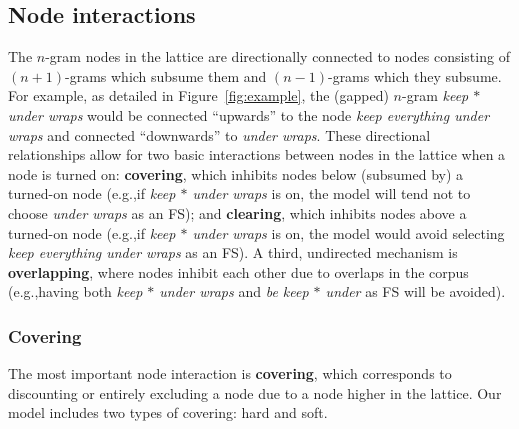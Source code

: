\documentclass[11pt,letterpaper]{article}
\makeatletter
\def \eg {e.g.,\@ }
\newcommand{\gap}{$*$\xspace}
\newcommand{\ex}[1]{\textit{#1}\xspace}
\newcommand{\termdef}[1]{\textbf{#1}\xspace}
\newcommand{\figref}[2][]{Figure#1~\ref{#2}\xspace}
\makeatother
\begin{document}
\subsection{Node interactions}

The $n$-gram nodes in the lattice are directionally connected to nodes consisting of $(n+1)$-grams which subsume them and $(n-1)$-grams which they subsume. For example, as detailed in \figref{fig:example}, the (gapped) $n$-gram \ex{keep \gap under wraps} would be connected ``upwards'' to the node \ex{keep everything under wraps} and connected ``downwards'' to \ex{under wraps}. These directional relationships allow for two basic interactions between nodes in the lattice when a node is turned on: \termdef{covering}, which inhibits nodes below (subsumed by) a turned-on node (\eg if \ex{keep \gap under wraps} is on, the model will tend not to choose \ex{under wraps} as an FS); and \termdef{clearing}, which inhibits nodes above a turned-on node (\eg if \ex{keep \gap under wraps} is on, the model would avoid selecting \ex{keep everything under wraps} as an FS). A third, undirected mechanism is \termdef{overlapping}, where nodes inhibit each other due to overlaps in the corpus (\eg having both \ex{keep \gap under wraps} and \ex{be keep \gap under} as FS will be avoided).


\subsubsection{Covering}
The most important node interaction is \termdef{covering}, which corresponds to discounting or entirely excluding a node due to a node higher in the lattice. Our model includes two types of covering: hard and soft. 
\end{document}
